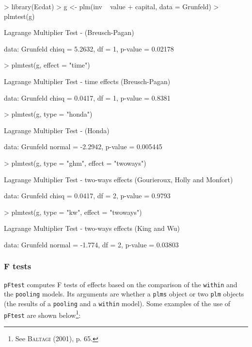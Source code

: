\documentclass[a4paper]{article}
\begin{document}
\begin{Schunk}
\begin{Sinput}
> library(Ecdat)
> g <- plm(inv ~ value + capital, data = Grunfeld)
> plmtest(g)
\end{Sinput}
\begin{Soutput}
	Lagrange Multiplier Test - (Breusch-Pagan)

data:  Grunfeld 
chisq = 5.2632, df = 1, p-value = 0.02178
\end{Soutput}
\begin{Sinput}
> plmtest(g, effect = "time")
\end{Sinput}
\begin{Soutput}
	Lagrange Multiplier Test - time effects (Breusch-Pagan)

data:  Grunfeld 
chisq = 0.0417, df = 1, p-value = 0.8381
\end{Soutput}
\begin{Sinput}
> plmtest(g, type = "honda")
\end{Sinput}
\begin{Soutput}
	Lagrange Multiplier Test - (Honda)

data:  Grunfeld 
normal = -2.2942, p-value = 0.005445
\end{Soutput}
\begin{Sinput}
> plmtest(g, type = "ghm", effect = "twoways")
\end{Sinput}
\begin{Soutput}
	Lagrange Multiplier Test - two-ways effects (Gourieroux, Holly and
	Monfort)

data:  Grunfeld 
chisq = 0.0417, df = 2, p-value = 0.9793
\end{Soutput}
\begin{Sinput}
> plmtest(g, type = "kw", effect = "twoways")
\end{Sinput}
\begin{Soutput}
	Lagrange Multiplier Test - two-ways effects (King and Wu)

data:  Grunfeld 
normal = -1.774, df = 2, p-value = 0.03803
\end{Soutput}
\end{Schunk}

\subsubsection{F tests}

\texttt{pFtest} computes F tests of effects based on the comparison of
the  \texttt{within} and the \texttt{pooling} models. Its arguments
are whether a \texttt{plms} object or two \texttt{plm} objects
(the results of a  \texttt{pooling} and a \texttt{within} model).
Some examples of the use of \texttt{pFtest} are shown below\footnote{See \textsc{Baltagi} (2001),
  p. 65.}:
\end{document}

